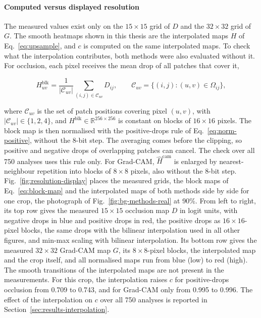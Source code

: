 \paragraph{Computed versus displayed resolution}
\label{sec:methodology-resolution}
The measured values exist only on the $15 \times 15$ grid of $D$ and the
$32 \times 32$ grid of $G$. The smooth heatmaps shown in this thesis are the
interpolated maps $H$ of Eq.~\eqref{eq:upsample}, and $c$ is computed on the same
interpolated maps. To check what the interpolation contributes, both methods were also
evaluated without it. For occlusion, each pixel receives the mean drop of all patches
that cover it,

\begin{equation}
H^{\mathrm{blk}}_{uv} = \frac{1}{|\mathcal{C}_{uv}|}
\sum_{(i,j) \in \mathcal{C}_{uv}} D_{ij}, \qquad
\mathcal{C}_{uv} = \{(i, j) : (u, v) \in \Omega_{ij}\},
\label{eq:block-map}
\end{equation}

where $\mathcal{C}_{uv}$ is the set of patch positions covering pixel $(u, v)$, with
$|\mathcal{C}_{uv}| \in \{1, 2, 4\}$, and $H^{\mathrm{blk}} \in
\mathbb{R}^{256 \times 256}$ is constant on blocks of $16 \times 16$ pixels. The block
map is then normalised with the positive-drops rule of Eq.~\eqref{eq:norm-positive},
without the 8-bit step. The averaging comes before the clipping, so positive and
negative drops of overlapping patches can cancel. The check over all 750 analyses uses
this rule only. For Grad-CAM, $\hat{H}^{\mathrm{cam}}$ is enlarged by
nearest-neighbour repetition into blocks of $8 \times 8$ pixels, also without the
8-bit step. Fig.~\ref{fig:resolution-display} places the measured grids, the block
maps of Eq.~\eqref{eq:block-map} and the interpolated maps of both methods side by
side for one crop, the photograph of Fig.~\ref{fig:bg-methods-real} at 90\%. From left to right, its top row gives the measured
$15 \times 15$ occlusion map $D$ in logit units, with negative drops in blue and positive
drops in red, the positive drops as $16 \times 16$-pixel blocks, the same drops with the
bilinear interpolation used in all other figures, and min-max scaling with bilinear
interpolation. Its bottom row gives the measured $32 \times 32$ Grad-CAM map $G$, its
$8 \times 8$-pixel blocks, the interpolated map and the crop itself, and all normalised
maps run from blue (low) to red (high). The smooth
transitions of the interpolated maps are not present in the measurements. For this
crop, the interpolation raises $c$ for positive-drops occlusion from 0.709 to 0.743,
and for Grad-CAM only from 0.995 to 0.996. The effect of the interpolation on $c$ over
all 750 analyses is reported in Section~\ref{sec:results-interpolation}.

